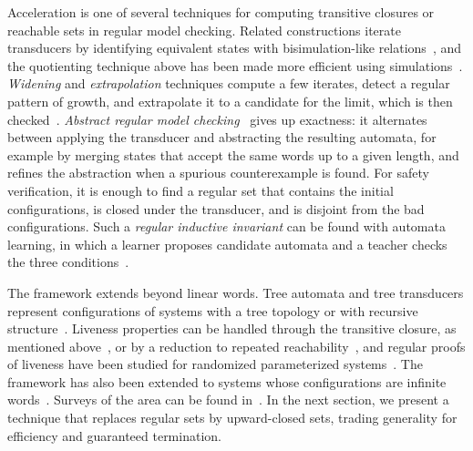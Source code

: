 Acceleration is one of several techniques for computing transitive closures or
reachable sets in regular model checking. Related constructions iterate
transducers by identifying equivalent states with bisimulation-like
relations~\cite{DLS01}, and the quotienting technique above has been made
more efficient using simulations~\cite{AJNO03}. \emph{Widening} and
\emph{extrapolation} techniques compute a few iterates, detect a regular
pattern of growth, and extrapolate it to a candidate for the limit, which is
then checked~\cite{Tou01,BLW03,BT02}. \emph{Abstract regular model
checking}~\cite{BHV04} gives up exactness: it alternates between applying the
transducer and abstracting the resulting automata, for example by merging
states that accept the same words up to a given length, and refines the
abstraction when a spurious counterexample is found. For safety verification,
it is enough to find a regular set that contains the initial configurations,
is closed under the transducer, and is disjoint from the bad configurations.
Such a \emph{regular inductive invariant} can be found with automata
learning, in which a learner proposes candidate automata and a teacher
checks the three conditions~\cite{HV05,NJ13,CHLR17}.

The framework extends beyond linear words. Tree automata and tree transducers
represent configurations of systems with a tree topology or with recursive
structure~\cite{AJMO02,BT02}. Liveness properties can be handled through the
transitive closure, as mentioned above~\cite{AJNOS04}, or by a reduction to
repeated reachability~\cite{BLW05}, and regular proofs of liveness have been
studied for randomized parameterized systems~\cite{LR16}. The framework has
also been extended to systems whose configurations are infinite
words~\cite{BLW04}. Surveys of the area
can be found in~\cite{AJNS04,Abd12,Abd21}. In the next section, we present a
technique that replaces regular sets by upward-closed sets, trading generality
for efficiency and guaranteed termination.
